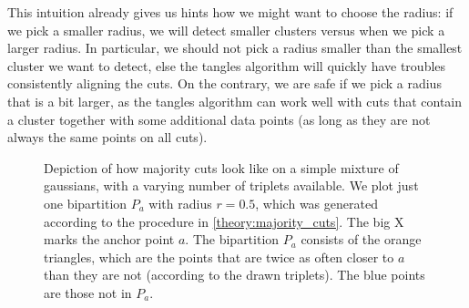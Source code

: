 This intuition already gives us hints how we might want to choose the radius: if we pick a smaller radius, we will detect smaller clusters versus when we pick a larger radius. 
In particular, we should not pick a radius smaller than the smallest cluster we want to detect, else the tangles algorithm will quickly have troubles consistently aligning
the cuts. On the contrary, we are safe if we pick a radius that is a bit larger, as the tangles algorithm can work well with cuts that contain a cluster together with some additional data points 
(as long as they are not always the same points on all cuts).

\onecolumn
\begin{figure}[ht]
    \centering
    \subfloat[500 triplets]{%
      \resizebox{0.5\textwidth}{!}{}
  }
    \subfloat[5000 triplets]{%
      \resizebox{0.5\textwidth}{!}{}}
    \hfill
    \subfloat[20000 triplets]{%
      \resizebox{0.5\textwidth}{!}{}}
    \caption{Depiction of how majority cuts look like on a simple mixture of gaussians, with a varying number of triplets available. 
        We plot just one bipartition $P_a$ with radius $r=0.5$, which was generated according to the procedure in \autoref{theory:majority_cuts}. The big X marks the anchor point $a$. 
        The bipartition $P_a$ consists of the orange triangles, which are the points that are twice as often closer to $a$ than they are not (according to the drawn triplets). 
        The blue points are those not in $P_a$.}
    \label{fig:majority_cut}
\end{figure}
